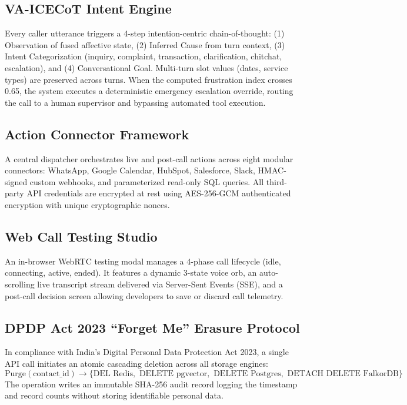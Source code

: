 \documentclass[12pt,a4paper]{article}
\begin{document}
\subsection{VA-ICECoT Intent Engine}
Every caller utterance triggers a 4-step intention-centric chain-of-thought: (1) Observation of fused affective state, (2) Inferred Cause from turn context, (3) Intent Categorization (inquiry, complaint, transaction, clarification, chitchat, escalation), and (4) Conversational Goal. Multi-turn slot values (dates, service types) are preserved across turns. When the computed frustration index crosses 0.65, the system executes a deterministic emergency escalation override, routing the call to a human supervisor and bypassing automated tool execution.

\subsection{Action Connector Framework}
A central dispatcher orchestrates live and post-call actions across eight modular connectors: WhatsApp, Google Calendar, HubSpot, Salesforce, Slack, HMAC-signed custom webhooks, and parameterized read-only SQL queries. All third-party API credentials are encrypted at rest using AES-256-GCM authenticated encryption with unique cryptographic nonces.

\subsection{Web Call Testing Studio}
An in-browser WebRTC testing modal manages a 4-phase call lifecycle (idle, connecting, active, ended). It features a dynamic 3-state voice orb, an auto-scrolling live transcript stream delivered via Server-Sent Events (SSE), and a post-call decision screen allowing developers to save or discard call telemetry.

\subsection{DPDP Act 2023 ``Forget Me'' Erasure Protocol}
In compliance with India's Digital Personal Data Protection Act 2023, a single API call initiates an atomic cascading deletion across all storage engines:
\begin{equation}
    \text{Purge}(\text{contact\_id}) \rightarrow \{\text{DEL Redis}, \text{ DELETE pgvector}, \text{ DELETE Postgres}, \text{ DETACH DELETE FalkorDB}\}
\end{equation}
The operation writes an immutable SHA-256 audit record logging the timestamp and record counts without storing identifiable personal data.
\end{document}
